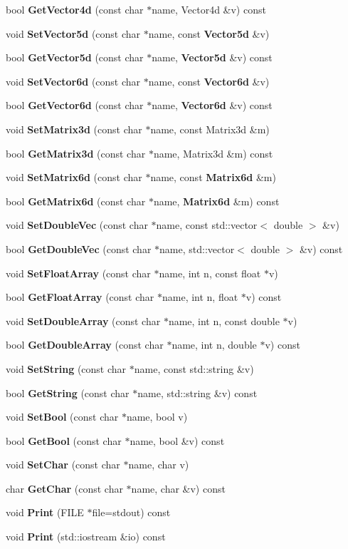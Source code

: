 \begin{DoxyCompactItemize}
\item 
bool {\bf \-Get\-Vector4d} (const char $\ast$name, \-Vector4d \&v) const 
\item 
void {\bf \-Set\-Vector5d} (const char $\ast$name, const {\bf \-Vector5d} \&v)
\item 
bool {\bf \-Get\-Vector5d} (const char $\ast$name, {\bf \-Vector5d} \&v) const 
\item 
void {\bf \-Set\-Vector6d} (const char $\ast$name, const {\bf \-Vector6d} \&v)
\item 
bool {\bf \-Get\-Vector6d} (const char $\ast$name, {\bf \-Vector6d} \&v) const 
\item 
void {\bf \-Set\-Matrix3d} (const char $\ast$name, const \-Matrix3d \&m)
\item 
bool {\bf \-Get\-Matrix3d} (const char $\ast$name, \-Matrix3d \&m) const 
\item 
void {\bf \-Set\-Matrix6d} (const char $\ast$name, const {\bf \-Matrix6d} \&m)
\item 
bool {\bf \-Get\-Matrix6d} (const char $\ast$name, {\bf \-Matrix6d} \&m) const 
\item 
void {\bf \-Set\-Double\-Vec} (const char $\ast$name, const std\-::vector$<$ double $>$ \&v)
\item 
bool {\bf \-Get\-Double\-Vec} (const char $\ast$name, std\-::vector$<$ double $>$ \&v) const 
\item 
void {\bf \-Set\-Float\-Array} (const char $\ast$name, int n, const float $\ast$v)
\item 
bool {\bf \-Get\-Float\-Array} (const char $\ast$name, int n, float $\ast$v) const 
\item 
void {\bf \-Set\-Double\-Array} (const char $\ast$name, int n, const double $\ast$v)
\item 
bool {\bf \-Get\-Double\-Array} (const char $\ast$name, int n, double $\ast$v) const 
\item 
void {\bf \-Set\-String} (const char $\ast$name, const std\-::string \&v)
\item 
bool {\bf \-Get\-String} (const char $\ast$name, std\-::string \&v) const 
\item 
void {\bf \-Set\-Bool} (const char $\ast$name, bool v)
\item 
bool {\bf \-Get\-Bool} (const char $\ast$name, bool \&v) const 
\item 
void {\bf \-Set\-Char} (const char $\ast$name, char v)
\item 
char {\bf \-Get\-Char} (const char $\ast$name, char \&v) const 
\item 
void {\bf \-Print} (\-F\-I\-L\-E $\ast$file=stdout) const 
\item 
void {\bf \-Print} (std\-::iostream \&io) const 
\end{DoxyCompactItemize}
